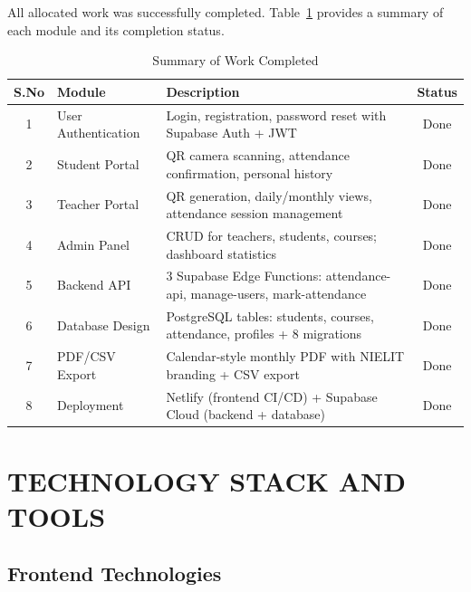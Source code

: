 \documentclass{SOICTthesis}
\begin{document}
All allocated work was successfully completed. Table~\ref{tab:work_completed} provides a summary of each module and its completion status.

\begin{table}[H]
\centering
\caption{Summary of Work Completed}
\label{tab:work_completed}
\begin{tabular}{|c|p{3cm}|p{7.5cm}|c|}
    \hline
    \textbf{S.No} & \textbf{Module} & \textbf{Description} & \textbf{Status} \\
    \hline
    1 & User Authentication & Login, registration, password reset with Supabase Auth + JWT & Done \\
    \hline
    2 & Student Portal & QR camera scanning, attendance confirmation, personal history & Done \\
    \hline
    3 & Teacher Portal & QR generation, daily/monthly views, attendance session management & Done \\
    \hline
    4 & Admin Panel & CRUD for teachers, students, courses; dashboard statistics & Done \\
    \hline
    5 & Backend API & 3 Supabase Edge Functions: attendance-api, manage-users, mark-attendance & Done \\
    \hline
    6 & Database Design & PostgreSQL tables: students, courses, attendance, profiles + 8 migrations & Done \\
    \hline
    7 & PDF/CSV Export & Calendar-style monthly PDF with NIELIT branding + CSV export & Done \\
    \hline
    8 & Deployment & Netlify (frontend CI/CD) + Supabase Cloud (backend + database) & Done \\
    \hline
\end{tabular}
\end{table}


\chapter{TECHNOLOGY STACK AND TOOLS}
\label{ch:tech_stack}

\section{Frontend Technologies}
\label{sec:frontend_tech}
\end{document}
